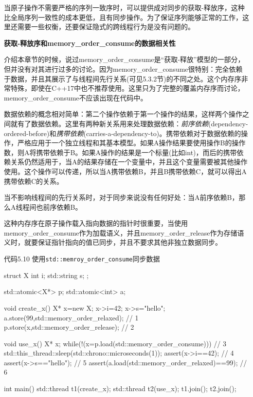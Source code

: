 当原子操作不需要严格的序列一致序时，可以提供成对同步的获取-释放序，这种比全局序列一致性的成本更低，且有同步操作。为了保证序列能够正常的工作，这里还需要一些权衡，还要保证隐式的跨线程行为是没有问题的。

\textbf{获取-释放序和memory\_order\_consume的数据相关性}

介绍本章节的时候，说过memory\_order\_consume是“获取-释放”模型的一部分，但并没有对其进行过多的讨论。因为memory\_order\_consume很特别：完全依赖于数据，并且其展示了与线程间先行关系(可见5.3.2节)的不同之处。这个内存序非常特殊，即使在C++17中也不推荐使用。这里只为了完整的覆盖内存序而讨论， memory\_order\_consume不应该出现在代码中。

数据依赖的概念相对简单：第二个操作依赖于第一个操作的结果，这样两个操作之间就有了数据依赖。这里有两种新关系用来处理数据依赖：\textit{前序依赖}(dependency-ordered-before)和\textit{携带依赖}(carries-a-dependency-to)。携带依赖对于数据依赖的操作，严格应用于一个独立线程和其基本模型。如果A操作结果要使用操作B的操作数，则A将携带依赖于B。如果A操作的结果是一个标量(比如int)，而后的携带依赖关系仍然适用于，当A的结果存储在一个变量中，并且这个变量需要被其他操作使用。这个操作可以传递，所以当A携带依赖B，并且B携带依赖C，就可以得出A携带依赖C的关系。

当不影响线程间的先行关系时，对于同步来说没有任何好处：当A前序依赖B，那么A线程间也前序依赖B。

这种内存序在原子操作载入指向数据的指针时很重要，当使用memory\_order\_consume作为加载语义，并且memory\_order\_release作为存储语义时，就要保证指针指向的值已同步，并且不要求其他非独立数据同步。

代码5.10 使用\texttt{std::memroy\_order\_consume}同步数据

\begin{cpp}
struct X
{
int i;
std::string s;
};

std::atomic<X*> p;
std::atomic<int> a;

void create_x()
{
  X* x=new X;
  x->i=42;
  x->s="hello";
  a.store(99,std::memory_order_relaxed);  // 1
  p.store(x,std::memory_order_release);  // 2
}

void use_x()
{
  X* x;
  while(!(x=p.load(std::memory_order_consume)))  // 3
    std::this_thread::sleep(std::chrono::microseconds(1));
  assert(x->i==42);  // 4
  assert(x->s=="hello");  // 5
  assert(a.load(std::memory_order_relaxed)==99);  // 6
}

int main()
{
  std::thread t1(create_x);
  std::thread t2(use_x);
  t1.join();
  t2.join();
}
\end{cpp}

